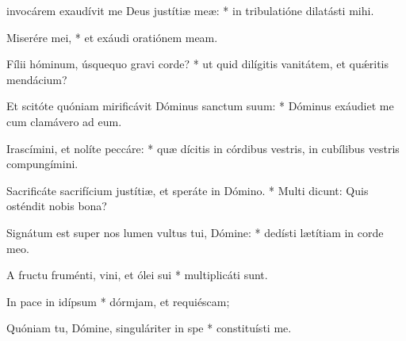 \begin{psalmus}

     invocárem exaudívit me Deus justítiæ meæ: * in tribulatióne dilatásti mihi.

    Miserére mei, * et exáudi oratiónem meam.

    Fílii hóminum, úsquequo gravi corde? * ut quid dilígitis vanitátem, et quǽritis mendácium?

    Et scitóte quóniam mirificávit Dóminus sanctum suum: * Dóminus exáudiet me cum clamávero ad eum.

    Irascímini, et nolíte peccáre: * quæ dícitis in córdibus vestris, in cubílibus vestris compungímini.

    Sacrificáte sacrifícium jus\-títiæ, et speráte in Dómino. * Multi dicunt: Quis osténdit nobis bona?

    Signátum est super nos lumen vultus tui, Dómine: * dedísti lætítiam in corde meo.

    A fructu fruménti, vini, et ólei sui * multiplicáti sunt.

    In pace in idípsum * dórmjam, et requiéscam;

    Quóniam tu, Dómine, singuláriter in spe * constituísti me.

\end{psalmus}
